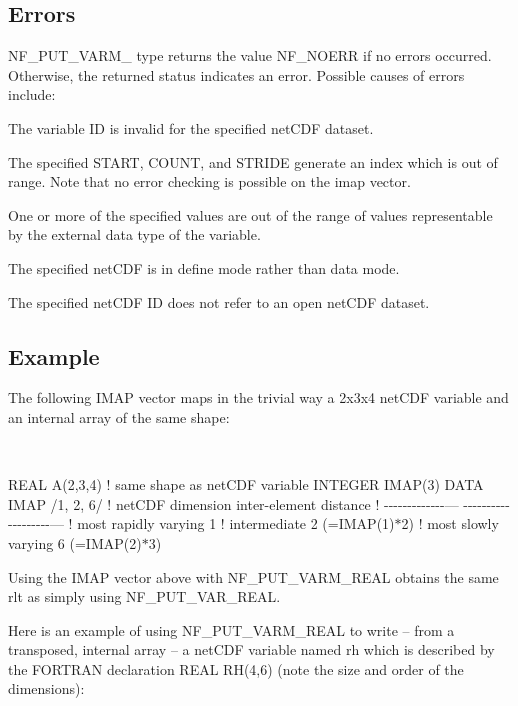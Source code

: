 \subsection*{Errors }

N\+F\+\_\+\+P\+U\+T\+\_\+\+V\+A\+R\+M\+\_\+ type returns the value N\+F\+\_\+\+N\+O\+E\+RR if no errors occurred. Otherwise, the returned status indicates an error. Possible causes of errors include\+:


\begin{DoxyItemize}
\item The variable ID is invalid for the specified net\+C\+DF dataset.
\item The specified S\+T\+A\+RT, C\+O\+U\+NT, and S\+T\+R\+I\+DE generate an index which is out of range. Note that no error checking is possible on the imap vector.
\item One or more of the specified values are out of the range of values representable by the external data type of the variable.
\item The specified net\+C\+DF is in define mode rather than data mode.
\item The specified net\+C\+DF ID does not refer to an open net\+C\+DF dataset.
\end{DoxyItemize}

\subsection*{Example }

The following I\+M\+AP vector maps in the trivial way a 2x3x4 net\+C\+DF variable and an internal array of the same shape\+:

 

R\+E\+AL A(2,3,4) ! same shape as net\+C\+DF variable I\+N\+T\+E\+G\+ER I\+M\+A\+P(3) D\+A\+TA I\+M\+AP /1, 2, 6/ ! net\+C\+DF dimension inter-\/element distance ! -\/-\/-\/-\/-\/-\/-\/-\/-\/-\/-\/-\/-\/--- -\/-\/-\/-\/-\/-\/-\/-\/-\/-\/-\/-\/-\/-\/-\/-\/-\/-\/-\/--- ! most rapidly varying 1 ! intermediate 2 (=I\+M\+A\+P(1)$\ast$2) ! most slowly varying 6 (=I\+M\+A\+P(2)$\ast$3)

Using the I\+M\+AP vector above with N\+F\+\_\+\+P\+U\+T\+\_\+\+V\+A\+R\+M\+\_\+\+R\+E\+AL obtains the same rlt as simply using N\+F\+\_\+\+P\+U\+T\+\_\+\+V\+A\+R\+\_\+\+R\+E\+AL.

Here is an example of using N\+F\+\_\+\+P\+U\+T\+\_\+\+V\+A\+R\+M\+\_\+\+R\+E\+AL to write – from a transposed, internal array – a net\+C\+DF variable named rh which is described by the F\+O\+R\+T\+R\+AN declaration R\+E\+AL R\+H(4,6) (note the size and order of the dimensions)\+:

